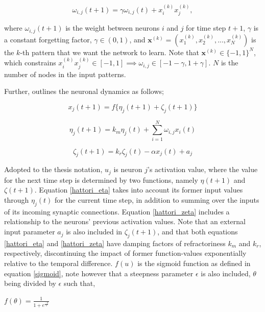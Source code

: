 \begin{equation}\label{hattori_hebbian_learning}
    \omega_{i,j}(t+1) = \gamma \omega_{i,j}(t) + x_i^{(k)} x_j^{(k)},
\end{equation}

where $\omega_{i,j}(t+1)$ is the weight between neurons $i$ and $j$ for time step $t+1$, $\gamma$ is a constant forgetting factor, $\gamma \in (0, 1)$, and $\textbf{x}^{(k)} = (x_1^{(k)}, x_2^{(k)}, ..., x_N^{(k)})$ is the $k$-th pattern that we want the network to learn. Note that $\textbf{x}^{(k)} \in \{-1,1\}^N$, which constrains $x_i^{(k)} x_j^{(k)} \in [-1,1] \implies \omega_{i,j} \in [-1-\gamma, 1+\gamma]$. $N$ is the number of nodes in the input patterns.

Further, \cite{Hattori2010} outlines the neuronal dynamics as follows;

\begin{equation}\label{hattori_next_output}
    x_j(t+1) = f\{\eta_j (t+1) + \zeta_j(t+1)\}
\end{equation}

\begin{equation}\label{hattori_eta}
    \eta_j(t+1) = k_m \eta_j(t) + \sum_{i=1}^{N} \omega_{i,j} x_i(t)
\end{equation}

\begin{equation}\label{hattori_zeta}
    \zeta_j(t+1) = k_r \zeta_j(t) - \alpha x_j(t) + a_j
\end{equation}

Adopted to the thesis notation, $u_j$ is neuron $j$'s activation value, where the value for the next time step is determined by two functions, namely $\eta(t+1)$ and $\zeta(t+1)$. Equation \ref{hattori_eta} takes into account its former input values through $\eta_j(t)$ for the current time step, in addition to summing over the inputs of its incoming synaptic connections. Equation \ref{hattori_zeta} includes a relationship to the neurons' previous activation values. Note that an external input parameter $a_j$ is also included in $\zeta_j(t+1)$, and that both equations \ref{hattori_eta} and \ref{hattori_zeta} have damping factors of refractoriness $k_m$ and $k_r$, respectively, discontinuing the impact of former function-values exponentially relative to the temporal difference. $f(u)$ is the sigmoid function as defined in equation \ref{sigmoid}, note however that a steepness parameter $\epsilon$ is also included, $\theta$ being divided by $\epsilon$ such that,

\begin{center}
\begin{math}
    f(\theta) = \frac{1}{1 + e^{\frac{-\theta}{\epsilon}}}
\end{math}
\end{center}

